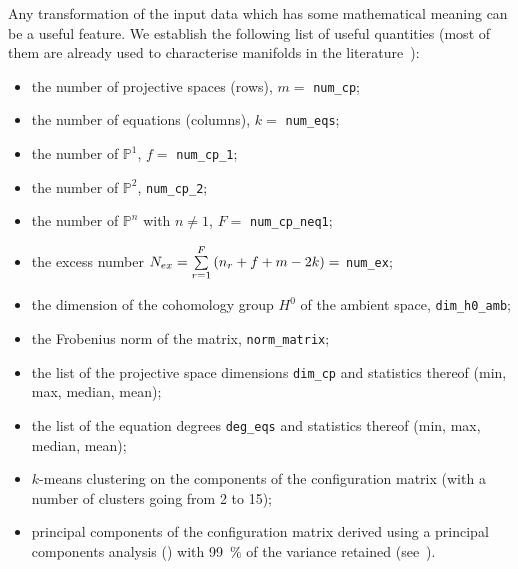 Any transformation of the input data which has some mathematical meaning can be a useful feature.
We establish the following list of useful quantities (most of them are already used to characterise \cicy manifolds in the literature~\cite{Hubsch:1992:CalabiyauManifoldsBestiary}):
\begin{itemize}
  \item the number of projective spaces (rows), $m = $ \texttt{num\_cp};

  \item the number of equations (columns), $k = $ \texttt{num\_eqs};

  \item the number of $\mathds{P}^1$, $f = $ \texttt{num\_cp\_1};

  \item the number of $\mathds{P}^2$, \texttt{num\_cp\_2};

  \item the number of $\mathds{P}^n$ with $n \neq 1$, $F = $ \texttt{num\_cp\_neq1};

  \item the excess number $N_{ex} = \sum\limits_{r = 1}^{F} \qty(n_r + f + m - 2k) =$ \texttt{num\_ex};

  \item the dimension of the cohomology group $H^0$ of the ambient space, \texttt{dim\_h0\_amb};

  \item the Frobenius norm of the matrix, \texttt{norm\_matrix};

  \item the list of the projective space dimensions \texttt{dim\_cp} and statistics thereof (min, max, median, mean);

  \item the list of the equation degrees \texttt{deg\_eqs} and statistics thereof (min, max, median, mean);

  \item $k$-means clustering on the components of the configuration matrix (with a number of clusters going from 2 to 15);\footnotemark{}

  \item principal components of the configuration matrix derived using a principal components analysis (\pca) with \SI{99}{\percent} of the variance retained (see~).
\end{itemize}


